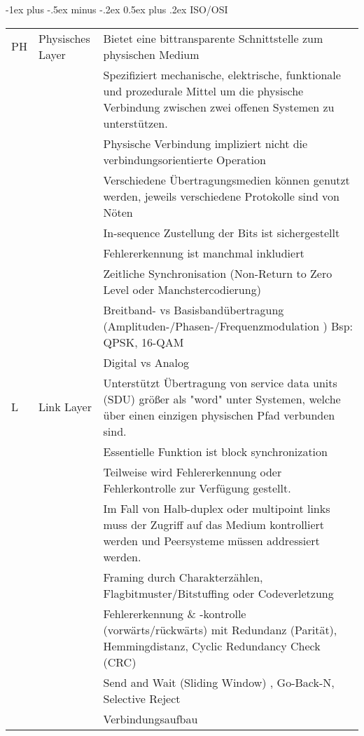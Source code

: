 \documentclass[10pt,landscape]{article}
\makeatletter
\renewcommand{\section}{\@startsection{section}{1}{0mm}%
                                {-1ex plus -.5ex minus -.2ex}%
                                {0.5ex plus .2ex}%
                                {\normalfont\large\bfseries}}
\makeatother
\begin{document}
\newpage


\section{ISO/OSI}
\begin{tabular}{l | l | l}
    PH & Physisches Layer & 
        Bietet eine bittransparente Schnittstelle zum physischen Medium\\
        &&Spezifiziert mechanische, elektrische, funktionale und prozedurale Mittel um die physische Verbindung zwischen zwei offenen Systemen zu unterstützen.\\
        &&Physische Verbindung impliziert nicht die verbindungsorientierte Operation\\
        &&Verschiedene Übertragungsmedien können genutzt werden, jeweils verschiedene Protokolle sind von Nöten\\
        &&In-sequence Zustellung der Bits ist sichergestellt\\
        &&Fehlererkennung ist manchmal inkludiert\\ \hline
        && Zeitliche Synchronisation (Non-Return to Zero Level oder Manchstercodierung)\\
        && Breitband- vs Basisbandübertragung (Amplituden-/Phasen-/Frequenzmodulation ) Bsp: QPSK, 16-QAM  \\
        && Digital vs Analog \\
        \hline
    L & Link Layer & 
        Unterstützt Übertragung von service data units (SDU) größer als "word" unter Systemen, welche über einen einzigen physischen Pfad verbunden sind.\\
        &&Essentielle Funktion ist block synchronization\\
        &&Teilweise wird Fehlererkennung oder Fehlerkontrolle zur Verfügung gestellt.\\
        &&Im Fall von Halb-duplex oder multipoint links muss der Zugriff auf das Medium kontrolliert werden und Peersysteme müssen addressiert werden.\\ \hline
        && Framing durch Charakterzählen, Flagbitmuster/Bitstuffing oder Codeverletzung \\
        && Fehlererkennung \& -kontrolle (vorwärts/rückwärts) mit Redundanz (Parität), Hemmingdistanz, Cyclic Redundancy Check (CRC)\\
        && Send and Wait (Sliding Window) , Go-Back-N, Selective Reject \\
        && Verbindungsaufbau \\

\end{tabular}
\end{document}
